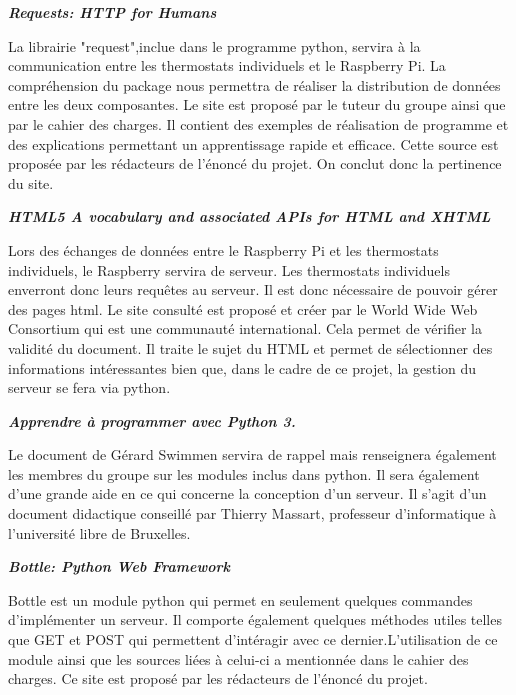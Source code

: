 \documentclass[12pt]{report}
\begin{document}
\vspace*{1cm}

\textbf{{\textit{Requests: HTTP for Humans}}} \cite{_requests:_????}

La librairie "request",inclue dans le programme python, servira à la communication entre les thermostats individuels et le Raspberry Pi. La compr\'{e}hension  du package nous permettra de r\'{e}aliser la distribution de donn\'{e}es entre les deux composantes. Le site est propos\'{e} par le tuteur du groupe ainsi que par le cahier des charges. Il contient des exemples de r\'{e}alisation de programme et des explications permettant un apprentissage rapide et efficace. 
Cette source est proposée par les rédacteurs de l'énoncé du projet. On conclut donc la pertinence du site.

\vspace*{1cm}
\textbf{\textit{HTML5 A vocabulary and associated APIs for HTML and XHTML}} \cite{_html5_????}

Lors des \'{e}changes de donn\'{e}es entre le Raspberry Pi et les thermostats individuels, le Raspberry servira de serveur. Les thermostats individuels enverront donc leurs requ\^{e}tes au serveur. Il est donc nécessaire de pouvoir g\'{e}rer des pages html.
Le site consult\'{e} est propos\'{e} et cr\'{e}er par le World Wide Web Consortium qui est une communauté international. Cela permet de vérifier la validité du document. Il traite le sujet du HTML et permet de s\'{e}lectionner des informations int\'{e}ressantes bien que, dans le cadre de ce projet, la gestion du serveur se fera via python.
 

\vspace*{1cm}
\textbf{\textit{Apprendre \`{a} programmer avec {Python} 3.}}\cite{swimmen_gerard_apprendre_2012}

Le document de G\'{e}rard Swimmen servira de rappel mais renseignera \'{e}galement les membres du groupe sur les modules inclus dans python. Il sera également d'une grande aide en ce qui concerne la conception d'un serveur.
Il s'agit d'un document didactique conseill\'{e} par Thierry Massart, professeur d'informatique \`{a} l'universit\'{e} libre de Bruxelles. 
\vspace*{1cm}

\textbf{\textit{Bottle: Python Web Framework}} \cite{_bottle:_????}

Bottle est un module python qui permet en seulement quelques commandes d'impl\'{e}menter un serveur. Il comporte \'{e}galement quelques m\'{e}thodes utiles telles que GET et POST qui permettent d'int\'{e}ragir avec ce dernier.L'utilisation de ce module ainsi que les sources li\'{e}es \`{a} celui-ci a mentionn\'{e}e dans le cahier des charges. Ce site est proposé par les rédacteurs de l'énoncé du projet.
\vspace*{1cm}
\end{document}

